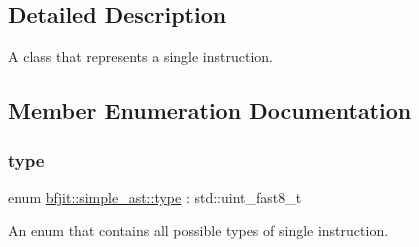 \subsection{Detailed Description}
A class that represents a single instruction. 

\subsection{Member Enumeration Documentation}
\hypertarget{classbfjit_1_1simple__ast_aa401e9909cc8e86d25144285d64ac32a}{}\label{classbfjit_1_1simple__ast_aa401e9909cc8e86d25144285d64ac32a} 
\subsubsection{\texorpdfstring{type}{type}}
{\footnotesize\ttfamily enum \hyperlink{classbfjit_1_1simple__ast_aa401e9909cc8e86d25144285d64ac32a}{bfjit\+::simple\+\_\+ast\+::type} \+: std\+::uint\+\_\+fast8\+\_\+t\hspace{0.3cm}{\ttfamily [strong]}}



An enum that contains all possible types of single instruction. 

